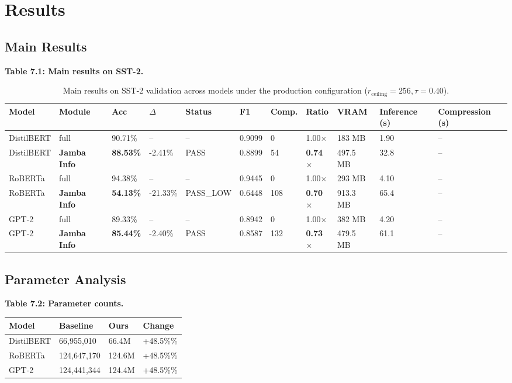 \section{Results}

\subsection{Main Results}

\textbf{Table 7.1: Main results on SST-2.}

\begin{table}[t]
\centering
\small
\begin{tabular}{lllllllllll}
\toprule
\textbf{Model} & \textbf{Module} & \textbf{Acc} & \textbf{$\Delta$} & \textbf{Status} & \textbf{F1} & \textbf{Comp.} & \textbf{Ratio} & \textbf{VRAM} & \textbf{Inference (s)} & \textbf{Compression (s)} \\
\midrule
DistilBERT & full & 90.71\% & -- & -- & 0.9099 & 0 & 1.00$\times$ & 183 MB & 1.90 & -- \\
DistilBERT & \textbf{Jamba Info} & \textbf{88.53\%} & -2.41\% & PASS & 0.8899 & 54 & \textbf{0.74$\times$} & 497.5 MB & 32.8 & -- \\
RoBERTa & full & 94.38\% & -- & -- & 0.9445 & 0 & 1.00$\times$ & 293 MB & 4.10 & -- \\
RoBERTa & \textbf{Jamba Info} & \textbf{54.13\%} & -21.33\% & PASS_LOW & 0.6448 & 108 & \textbf{0.70$\times$} & 913.3 MB & 65.4 & -- \\
GPT-2 & full & 89.33\% & -- & -- & 0.8942 & 0 & 1.00$\times$ & 382 MB & 4.20 & -- \\
GPT-2 & \textbf{Jamba Info} & \textbf{85.44\%} & -2.40\% & PASS & 0.8587 & 132 & \textbf{0.73$\times$} & 479.5 MB & 61.1 & -- \\
\bottomrule
\end{tabular}
\caption{Main results on SST-2 validation across models under the production configuration ($r_{\mathrm{ceiling}}=256, \tau=0.40$).}
\label{tab:main_sst2}
\end{table}

\subsection{Parameter Analysis}

\textbf{Table 7.2: Parameter counts.}

\begin{table}[H]
\centering
\small
\begin{tabular}{llll}
\toprule
\textbf{Model} & \textbf{Baseline} & \textbf{Ours} & \textbf{Change} \\
\midrule
DistilBERT & 66,955,010 & 66.4M & +48.5\%\% \\
RoBERTa & 124,647,170 & 124.6M & +48.5\%\% \\
GPT-2 & 124,441,344 & 124.4M & +48.5\%\% \\
\bottomrule
\end{tabular}
\end{table}

